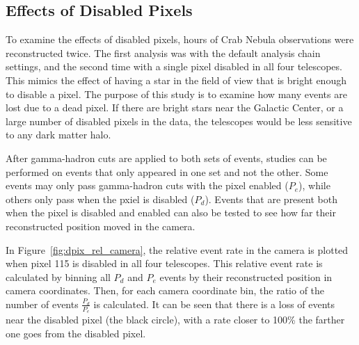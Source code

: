   \subsection{Effects of Disabled Pixels}

    To examine the effects of disabled pixels,  hours of Crab Nebula observations were reconstructed twice.
    The first analysis was with the default analysis chain settings, and the second time with a single pixel disabled in all four telescopes.
    This mimics the effect of having a star in the field of view that is bright enough to disable a pixel.
    The purpose of this study is to examine how many events are lost due to a dead pixel.
    If there are bright stars near the Galactic Center, or a large number of disabled pixels in the data, the telescopes would be less sensitive to any dark matter halo.

    After gamma-hadron cuts are applied to both sets of events, studies can be performed on events that only appeared in one set and not the other.
    Some events may only pass gamma-hadron cuts with the pixel enabled ($P_e$), while others only pass when the pxiel is disabled ($P_d$).
    Events that are present both when the pixel is disabled and enabled can also be tested to see how far their reconstructed position moved in the camera.

    In Figure~\ref{fig:dpix_rel_camera}, the relative event rate in the camera is plotted when pixel 115 is disabled in all four telescopes.
    This relative event rate is calculated by binning all $P_d$ and $P_e$ events by their reconstructed position in camera coordinates.
    Then, for each camera coordinate bin, the ratio of the number of events $\frac{P_d}{P_e}$ is calculated.
    It can be seen that there is a loss of events near the disabled pixel (the black circle), with a rate closer to 100\% the farther one goes from the disabled pixel.

